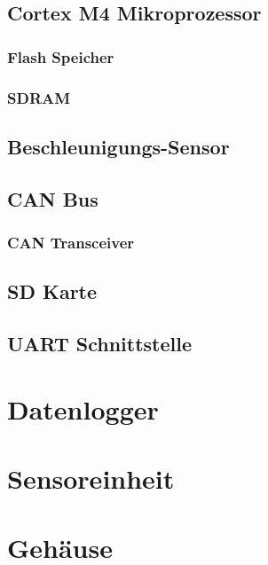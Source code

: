 \subsection{Cortex M4 Mikroprozessor}

\subsubsection{Flash Speicher}

\subsubsection{SDRAM}


\subsection{Beschleunigungs-Sensor}

\subsection{CAN Bus}

\subsubsection{CAN Transceiver}


\subsection{SD Karte}

\subsection{UART Schnittstelle}

\section{Datenlogger}

\section{Sensoreinheit}

\section{Gehäuse}